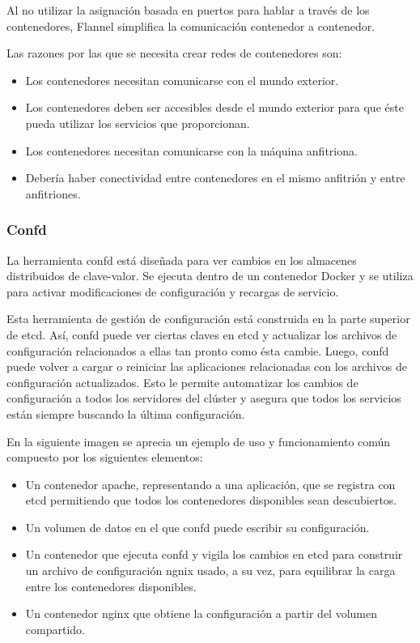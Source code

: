 Al no utilizar la asignación basada en puertos para hablar a través de los contenedores, Flannel simplifica la comunicación contenedor a contenedor.

Las razones por las que se necesita crear redes de contenedores son:
\begin{itemize}
\item Los contenedores necesitan comunicarse con el mundo exterior.
\item Los contenedores deben ser accesibles desde el mundo exterior para que éste pueda utilizar los servicios que proporcionan.
\item Los contenedores necesitan comunicarse con la máquina anfitriona.
\item Debería haber conectividad entre contenedores en el mismo anfitrión y entre anfitriones.
\end{itemize}

\subsubsection{Confd}

La herramienta confd está diseñada para ver cambios en los almacenes distribuidos de clave-valor. Se ejecuta dentro de un contenedor Docker y se utiliza para activar modificaciones de configuración y recargas de servicio.

Esta herramienta de gestión de configuración está construida en la parte superior de etcd. Así, confd puede ver ciertas claves en etcd y actualizar los archivos de configuración relacionados a ellas tan pronto como ésta cambie. Luego, confd puede volver a cargar o reiniciar las aplicaciones relacionadas con los archivos de configuración actualizados. Esto le permite automatizar los cambios de configuración a todos los servidores del clúster y asegura que todos los servicios están siempre buscando la última configuración.

En la siguiente imagen se aprecia un ejemplo de uso y funcionamiento común compuesto por los siguientes elementos: 
\begin{itemize}
\item Un contenedor apache, representando a una aplicación, que se registra con etcd permitiendo que todos los contenedores disponibles sean descubiertos. 
\item Un volumen de datos en el que confd puede escribir su configuración.
\item Un contenedor que ejecuta confd y vigila los cambios en etcd para construir un archivo de configuración ngnix usado, a su vez, para equilibrar la carga entre los contenedores disponibles.
\item Un contenedor nginx que obtiene la configuración a partir del volumen compartido.
\end{itemize}

